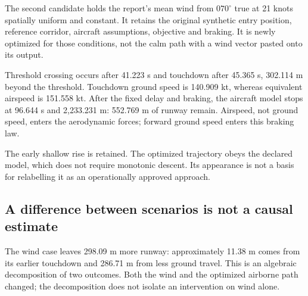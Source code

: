 \label{part:5}
The second candidate holds the report's mean wind from $070^\circ$ true at 21 knots spatially uniform and constant. It retains the original synthetic entry position, reference corridor, aircraft assumptions, objective and braking. It is newly optimized for those conditions, not the calm path with a wind vector pasted onto its output.


Threshold crossing occurs after 41.223 s and touchdown after 45.365 s, 302.114 m beyond the threshold. Touchdown ground speed is 140.909 kt, whereas equivalent airspeed is 151.558 kt. After the fixed delay and braking, the aircraft model stops at 96.644 s and 2,233.231 m: 552.769 m of runway remain. Airspeed, not ground speed, enters the aerodynamic forces; forward ground speed enters this braking law.

The early shallow rise is retained. The optimized trajectory obeys the declared model, which does not require monotonic descent. Its appearance is not a basis for relabelling it as an operationally approved approach.
\par\medskip
\subsection*{A difference between scenarios is not a causal estimate}

The wind case leaves 298.09 m more runway: approximately 11.38 m comes from its earlier touchdown and 286.71 m from less ground travel. This is an algebraic decomposition of two outcomes. Both the wind and the optimized airborne path changed; the decomposition does not isolate an intervention on wind alone.

